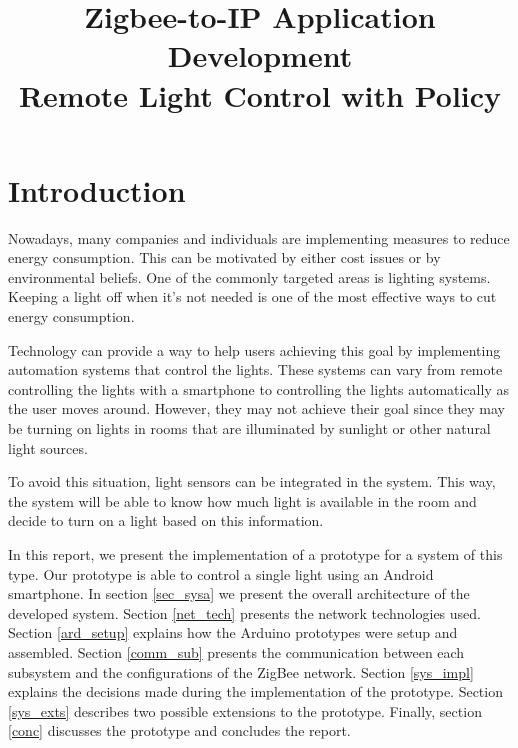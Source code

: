 \documentclass[conference, a4paper]{IEEEtran}
\begin{document}
\title{Zigbee-to-IP Application Development\\Remote Light Control with Policy}

\author{
\and
{}
}

\maketitle

\thispagestyle{plain}
\pagestyle{plain}

\section{Introduction}

Nowadays, many companies and individuals are implementing measures to reduce energy consumption. This can be motivated by either cost issues or by environmental beliefs. One of the commonly targeted areas is lighting systems. Keeping a light off when it's not needed is one of the most effective ways to cut energy consumption.

Technology can provide a way to help users achieving this goal by implementing automation systems that control the lights. These systems can vary from remote controlling the lights with a smartphone to controlling the lights automatically as the user moves around. However, they may not achieve their goal since they may be turning on lights in rooms that are illuminated by sunlight or other natural light sources.

To avoid this situation, light sensors can be integrated in the system. This way, the system will be able to know how much light is available in the room and decide to turn on a light based on this information.

In this report, we present the implementation of a prototype for a system of this type. Our prototype is able to control a single light using an Android smartphone. In section \ref{sec_sysa} we present the overall architecture of the developed system. Section \ref{net_tech} presents the network technologies used. Section \ref{ard_setup} explains how the Arduino prototypes were setup and assembled. Section \ref{comm_sub} presents the communication between each subsystem and the configurations of the ZigBee network. Section \ref{sys_impl} explains the decisions made during the implementation of the prototype. Section \ref{sys_exts} describes two possible extensions to the prototype. Finally, section \ref{conc} discusses the prototype and concludes the report.
\end{document}
